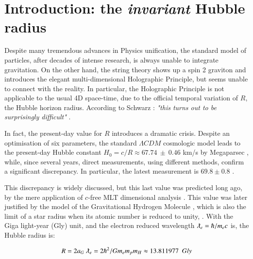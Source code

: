 \documentclass[a4paper,9pt]{article}
\begin{document}








\section{Introduction: the \textit{invariant} Hubble radius}\label{AxeTopologique}

Despite many tremendous advances in Physics unification, the standard model of particles, after decades of intense research, is always unable to integrate gravitation. On the other hand, the string theory shows up a spin 2 graviton and introduces the elegant multi-dimensional Holographic Principle, but seems unable to connect with the reality. In particular, the Holographic Principle is not applicable to the usual 4D space-time, due to the official temporal variation of $R$, the Hubble horizon radius. According to Schwarz : \textit {"this turns out to be surprisingly difficult"} \cite{Schwarz}.

In fact, the present-day value for $R$ introduces a dramatic crisis. Despite an optimisation of six parameters, the standard $\Lambda CDM$ cosmologic  model leads to the present-day Hubble constant $ H_0 = c/R \approx 67.74 ~\pm~ 0.46$ km/s by Megaparsec \cite{Zyla}, while, since several years, direct measurements, using different methods, confirm a significant discrepancy. In particular, the latest measurement is $69.8 \pm 0.8$ \cite{Freedman}. 

This discrepancy is widely discussed, but this last value was predicted long ago, by the mere application of $c$-free MLT dimensional analysis \cite{Sanchez1}. This value was later justified by the model of the Gravitational Hydrogen Molecule \cite{Sanchez2}, which is also the limit of a star radius when its atomic number is reduced to unity, \cite{Davies}. With the Giga light-year (Gly) unit, and the electron reduced wavelength $\lambdabar_e = \hbar/m_ec$ is, the Hubble radius is:


\begin{equation}\label{Eq1}
R =2a_G ~\lambdabar_e  = 2 \hbar^2/Gm_e m_p m_H \approx 13.811977~~Gly 
 \end{equation}
\end{document}
